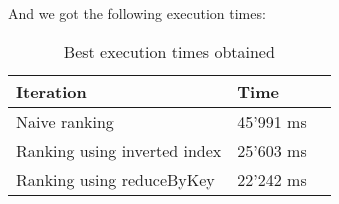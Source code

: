 \documentclass[a4paper]{article}
\begin{document}
	And we got the following execution times:
	
	\begin{table}[H]
		\centering

		\begin{tabular}{|l|l|l|}
			\hline
			\textbf{Iteration}           & \textbf{Time} \\ \hline
			Naive ranking                & 45'991 ms     \\ \hline
			Ranking using inverted index & 25'603 ms     \\ \hline
			Ranking using reduceByKey    & 22'242 ms     \\ \hline
		\end{tabular}
		\caption{Best execution times obtained}
	\end{table}
	
\end{document}
